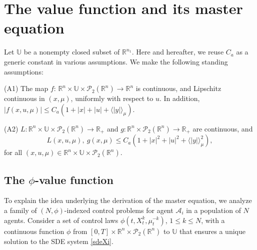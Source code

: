 \documentclass{amsart}
\theoremstyle{definition}
\theoremstyle{remark}
\def\cal{\mathcal}
\numberwithin{equation}{section}
\begin{document}
\section{The value function and its master equation}
\label{sec:me}





 Let $ \mathbb{U}$ be a nonempty closed subset of $ \mathbb{R}^{n_1}$.
 Here and hereafter, we reuse $C_a$ as a generic constant in various assumptions.
We make the following standing assumptions:



(A1) The map $f$:
$ \mathbb{R}^n\times \mathbb{U}\times
{\cal P}_2(\mathbb{R}^n)\to \mathbb{R}^{n}$ is continuous, and
 Lipschitz continuous in $(x,\mu)$,
uniformly with respect to $u$.  In addition,
$|f(x,u,\mu)|\le  C_{a}(1+|x|+|u|+\langle|y|\rangle_\mu)$.

(A2) $L: \mathbb{R}^n \times \mathbb{U}\times {\mathcal P}_2(\mathbb{R}^n) \to \mathbb{R}_+$  and $g: \mathbb{R}^n \times {\cal P}_2(\mathbb{R}^n)\to \mathbb{R}_+$ are  continuous, and
$$
L( x, u, \mu),\ g(x,\mu) \le C_a(1+|x|^2+|u|^2+\langle|y|\rangle^2_\mu),
$$
for all  $ (x,u,\mu)\in  \mathbb{R}^n \times \mathbb{U}\times {\cal P}_2(\mathbb{R}^n)$.




\subsection{The $\phi$-value function}

To explain the idea underlying the  derivation of  the master equation,
 we analyze a family of  $(N,\phi)$-indexed control problems for agent ${\cal A}_i$ in a population of $N$ agents.
 Consider a set of control laws
$\phi(t,X_t^k, \mu_t^{-k})$, $1\le k\le N$,  with a continuous function $\phi $ from $[0,T]\times \mathbb{R}^n \times {\mathcal P}_2 (\mathbb{R}^n )$   to ${\mathbb U}$ that ensures a unique solution to the SDE system \eqref{sdeXi}.
\end{document}
